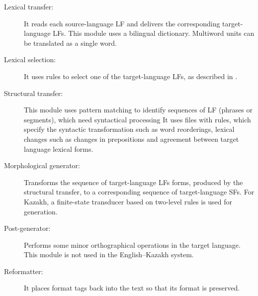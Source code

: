 \documentclass[11pt]{article}
\begin{document}
\begin{description}
\item[Lexical transfer:] It reads each source-language LF and delivers the corresponding target-language 
  LFs. This module uses a bilingual dictionary. 
 Multiword units can be translated as a single word.
\item[ Lexical selection:] It uses rules to select one of the target-language LFs, as described in \cite{tyers12a}.
\item [Structural transfer:] This module uses pattern matching to identify sequences of LF (phrases or 
  segments), which need syntactical processing 
It uses files with rules, which specify  the syntactic transformation such as word reorderings, 
  lexical changes such as changes in prepositions and agreement between target language lexical forms. %
\item[Morphological generator:] Transforms the sequence of target-language LFs forms, produced by the structural transfer, 
  to a corresponding sequence of target-language SFs. 
For Kazakh, a finite-state transducer based on two-level rules \citep{washingtonsalimzyantyers14} is used for generation. 
\item[Post-generator:] Performs some minor orthographical operations in the target language. This module is not used in the English--Kazakh system.
\item[ Reformatter:] It places format tags back into the text so that its format is preserved.
\end{description}
\end{document}

